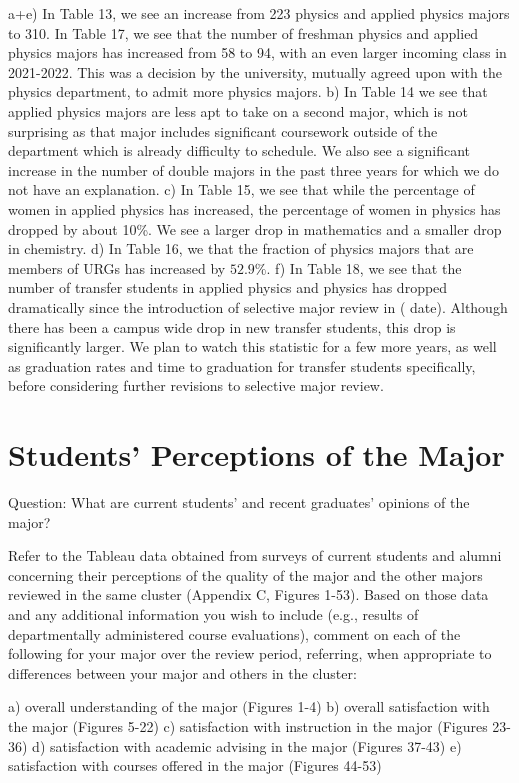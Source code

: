\documentclass[12pt]{article}
\begin{document}
a+e) In Table 13, we see an increase from 223 physics and applied physics majors to 310.  In Table 17, we see that the number of freshman physics and applied physics majors has increased from 58 to 94, with an even larger incoming class in 2021-2022.  This was a decision by the university, mutually agreed upon with the physics department, to admit more physics majors. 
b) In Table 14 we see that applied physics majors are less apt to take on a second major, which is not surprising as that major includes significant coursework outside of the department which is already difficulty to schedule.  We also see a significant increase in the number of double majors in the past three years for which we do not have an explanation.
c) In Table 15, we see that while the percentage of women in applied physics has increased, the percentage of women in physics has dropped by about 10\%.  We see a larger drop in mathematics and a smaller drop in chemistry.  
d) In Table 16, we that the fraction of physics majors that are members of URGs has increased by $52.9\%$.
f) In Table 18, we see that the number of transfer students in applied physics and physics has dropped dramatically since the introduction of selective major review in ({\color{red} date}).  Although there has been a campus wide drop in new transfer students, this drop is significantly larger.  We plan to watch this statistic for a few more years, as well as graduation rates and time to graduation for transfer students specifically, before considering further revisions to selective major review.





\section{Students’ Perceptions of the Major}
Question: What are current students’ and recent graduates’ opinions of the major?

Refer to the Tableau data obtained from surveys of current students and alumni concerning their perceptions of the quality of the major and the other majors reviewed in the same cluster (Appendix C, Figures 1-53). Based on those data and any additional information you wish to include (e.g., results of departmentally administered course evaluations), comment on each of the following for your major over the review period, referring, when appropriate to differences between your major and others in the cluster:

    a) overall understanding of the major (Figures 1-4)
    b) overall satisfaction with the major (Figures 5-22)
    c) satisfaction with instruction in the major (Figures 23-36)
    d) satisfaction with academic advising in the major (Figures 37-43)
    e) satisfaction with courses offered in the major (Figures 44-53)
\end{document}
